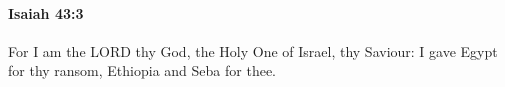 
		\paragraph{Isaiah 43:3} %
			\label{ISAIAH-43-3}

			For I am the LORD thy God, the Holy One of Israel, thy Saviour: I gave Egypt for thy ransom, Ethiopia and Seba for thee.


